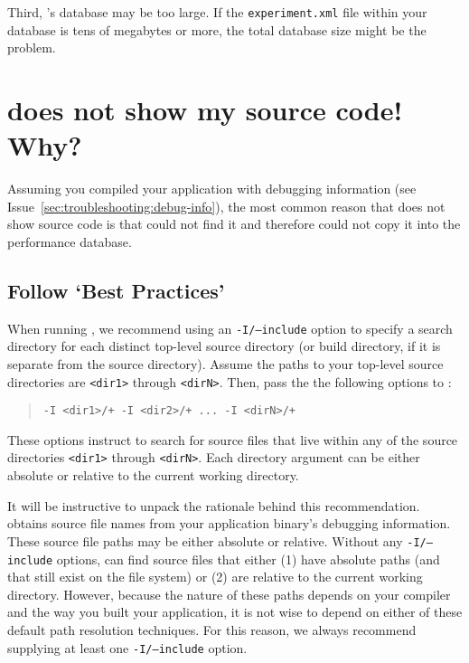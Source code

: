 \documentclass[11pt,letterpaper]{report}
\begin{document}
Third, \HPCToolkit{}'s database may be too large.
If the \texttt{experiment.xml} file within your database is tens of megabytes or more, the total database size might be the problem.



\section{\hpcviewer{} does not show my source code! Why?}


Assuming you compiled your application with debugging information (see Issue~\ref{sec:troubleshooting:debug-info}), the most common reason that \hpcviewer{} does not show source code is that \hpcprofAll{} could not find it and therefore could not copy it into the \HPCToolkit{} performance database.




\subsection{Follow `Best Practices'}

When running \hpcprofAll{}, we recommend using an \texttt{-I/--include} option to specify a search directory for each distinct top-level source directory (or build directory, if it is separate from the source directory).
Assume the paths to your top-level source directories are \texttt{<dir1>} through \texttt{<dirN>}.
Then, pass the the following options to \hpcprofAll{}:
\begin{quote}
  \verb|-I <dir1>/+ -I <dir2>/+ ... -I <dirN>/+|
\end{quote}
These options instruct \hpcprofAll{} to search for source files that live within any of the source directories \texttt{<dir1>} through \texttt{<dirN>}.
Each directory argument can be either absolute or relative to the current working directory.

It will be instructive to unpack the rationale behind this recommendation.
\hpcprofAll{} obtains source file names from your application binary's debugging information.
These source file paths may be either absolute or relative.
Without any \texttt{-I/--include} options, \hpcprofAll{} can find source files that either (1) have absolute paths (and that still exist on the file system) or (2) are relative to the current working directory.
However, because the nature of these paths depends on your compiler and the way you built your application, it is not wise to depend on either of these default path resolution techniques.
For this reason, we always recommend supplying at least one \texttt{-I/--include} option.
\end{document}
